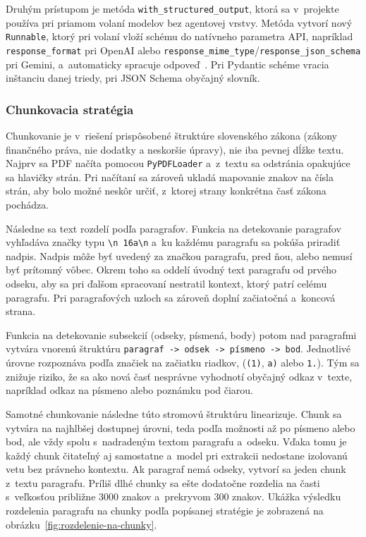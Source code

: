 Druhým prístupom je metóda \texttt{with\_structured\_output}, ktorá sa v~projekte používa pri priamom volaní modelov bez agentovej vrstvy. Metóda vytvorí nový \texttt{Runnable}, ktorý pri volaní vloží schému do natívneho parametra API, napríklad \texttt{response\_format} pri OpenAI alebo \texttt{response\_mime\_type}/\texttt{response\_json\_schema} pri Gemini, a~automaticky spracuje odpoveď~\cite{langchainGoogleResponseSchema,openaiStructuredOutput}. Pri Pydantic schéme vracia inštanciu danej triedy, pri JSON Schema obyčajný slovník.

\subsubsection{Chunkovacia stratégia}
\label{sec:chunkovacia-strategia}

Chunkovanie je v~riešení prispôsobené štruktúre slovenského zákona (zákony finančného práva, nie dodatky a neskoršie úpravy), nie iba pevnej dĺžke textu. Najprv sa PDF načíta pomocou \texttt{PyPDFLoader} a~z~textu sa odstránia opakujúce sa hlavičky strán. Pri načítaní sa zároveň ukladá mapovanie znakov na čísla strán, aby bolo možné neskôr určiť, z~ktorej strany konkrétna časť zákona pochádza.

Následne sa text rozdelí podľa paragrafov. Funkcia na detekovanie paragrafov vyhľadáva značky typu \texttt{\textbackslash n\textsection{} 16a\textbackslash n} a~ku každému paragrafu sa pokúša priradiť nadpis. Nadpis môže byť uvedený za značkou paragrafu, pred ňou, alebo nemusí byť prítomný vôbec. Okrem toho sa oddelí úvodný text paragrafu od prvého odseku, aby sa pri ďalšom spracovaní nestratil kontext, ktorý patrí celému paragrafu. Pri paragrafových uzloch sa zároveň doplní začiatočná a~koncová strana.

Funkcia na detekovanie subsekcií (odseky, písmená, body) potom nad paragrafmi vytvára vnorenú štruktúru \texttt{paragraf -> odsek -> písmeno -> bod}. Jednotlivé úrovne rozpoznáva podľa značiek na začiatku riadkov, (\texttt{(1)}, \texttt{a)} alebo \texttt{1.}). Tým sa znižuje riziko, že sa ako nová časť nesprávne vyhodnotí obyčajný odkaz v~texte, napríklad odkaz na písmeno alebo poznámku pod čiarou.

Samotné chunkovanie následne túto stromovú štruktúru linearizuje. Chunk sa vytvára na najhlbšej dostupnej úrovni, teda podľa možnosti až po písmeno alebo bod, ale vždy spolu s~nadradeným textom paragrafu a~odseku. Vďaka tomu je každý chunk čitateľný aj samostatne a~model pri extrakcii nedostane izolovanú vetu bez právneho kontextu. Ak paragraf nemá odseky, vytvorí sa jeden chunk z~textu paragrafu. Príliš dlhé chunky sa ešte dodatočne rozdelia na časti s~veľkosťou približne 3000 znakov a~prekryvom 300 znakov. Ukážka výsledku rozdelenia paragrafu na chunky podľa popísanej stratégie je zobrazená na obrázku~\ref{fig:rozdelenie-na-chunky}.

